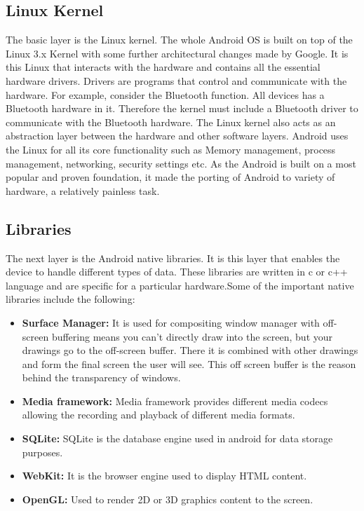 \subsection{Linux Kernel}
The basic layer is the Linux kernel. The whole Android OS is built on top of the Linux 3.x Kernel with some further architectural changes made by Google. It is this Linux that interacts with the hardware and contains all the essential hardware drivers. Drivers are programs that control and communicate with the hardware. For example, consider the Bluetooth function. All devices has a Bluetooth hardware in it. Therefore the kernel must include a Bluetooth driver to communicate with the Bluetooth hardware. The Linux kernel also acts as an abstraction layer between the hardware and other software layers. Android uses the Linux for all its core functionality such as Memory management, process management, networking, security settings etc. As the Android is built on a most popular and proven foundation, it made the porting of Android to variety of hardware, a relatively painless task.


\subsection{Libraries}
The next layer is the Android native libraries. It is this layer that enables the device to handle different types of data. These libraries are written in c or c++ language and are specific for a particular hardware.Some of the important native libraries include the following: 
\begin{itemize}

  \item \textbf{Surface Manager:} It is used for compositing window manager with off-screen buffering means you can't directly draw into the screen, but your drawings go to the off-screen buffer. There it is combined with other drawings and form the final screen the user will see. This off screen buffer is the reason behind the transparency of windows.

  \item \textbf{Media framework:} Media framework provides different media codecs allowing the recording and playback of different media formats.

  \item \textbf {SQLite:} SQLite is the database engine used in android for data storage purposes.

  \item \textbf{WebKit:} It is the browser engine used to display HTML content.

  \item\textbf{ OpenGL:} Used to render 2D or 3D graphics content to the screen.

  

\end{itemize}



